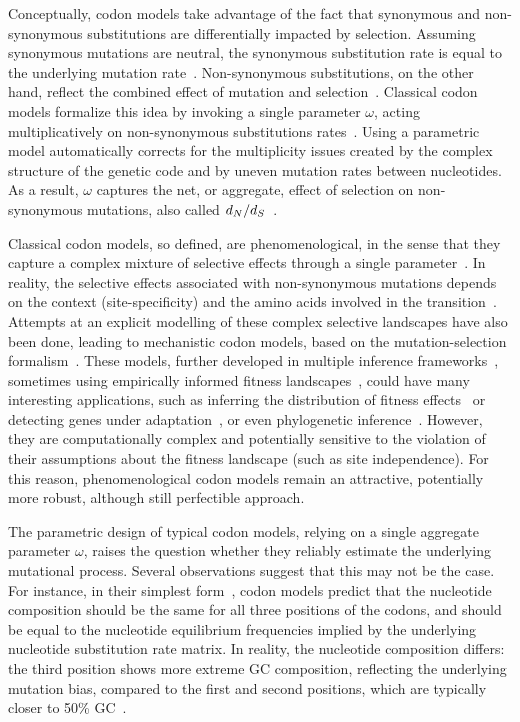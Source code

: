 \documentclass{article}
\begin{document}
Conceptually, codon models take advantage of the fact that {synonymous} and {non-synonymous} {substitutions} are differentially impacted by selection.
Assuming {synonymous} mutations are {neutral}, the {synonymous} {substitution} rate is equal to the underlying mutation rate~\citep{kimura1983neutral}.
Non-synonymous {substitutions}, on the other hand, reflect the combined effect of mutation and selection~\citep{Ohta1995}.
Classical codon models formalize this idea by invoking a single parameter $\omega$, acting multiplicatively on {non-synonymous} {substitutions} rates~\citep{Muse1994, Goldman1994}.
Using a parametric model automatically corrects for the multiplicity issues created by the complex structure of the genetic code and by uneven mutation rates between nucleotides.
As a result, $\omega$ captures the net, or aggregate, effect of selection on {non-synonymous} mutations, also called $d_N / d_S$~\citep{Spielman2015,DosReis2015}.

Classical codon models, so defined, are phenomenological, in the sense that they capture a complex mixture of selective effects through a single parameter~\citep{Rodrigue2010a}.
In reality, the selective effects associated with {non-synonymous} mutations depends on the context (site-specificity) and the amino acids involved in the transition~\citep{Kosiol2007}.
Attempts at an explicit modelling of these complex selective landscapes have also been done, leading to mechanistic codon models, based on the mutation-selection formalism~\citep{Halpern1998}.
These models, further developed in multiple inference frameworks~\citep{Rodrigue2010, Tamuri2012}, sometimes using empirically informed fitness landscapes~\citep{Bloom2014}, could have many interesting applications, such as inferring the distribution of fitness effects~\citep{Tamuri2012} or detecting genes under adaptation~\citep{Rodrigue2016, Rodrigue2021}, or even phylogenetic inference~\citep{Ren2005}.
However, they are computationally complex and potentially sensitive to the violation of their assumptions about the fitness landscape (such as site independence).
For this reason, phenomenological codon models remain an attractive, potentially more robust, although still perfectible approach.

The parametric design of typical codon models, relying on a single aggregate parameter $\omega$, raises the question whether they reliably estimate the underlying mutational process.
Several observations suggest that this may not be the case.
For instance, in their simplest form~\citep{Muse1994, Goldman1994}, codon models predict that the nucleotide composition should be the same for all three positions of the codons, and should be equal to the nucleotide equilibrium frequencies implied by the underlying nucleotide {substitution} rate matrix.
In reality, the nucleotide composition differs: the third position shows more extreme GC composition, reflecting the underlying mutation bias, compared to the first and second positions, which are typically closer to 50\% GC~\citep{Singer2000}.
\end{document}
